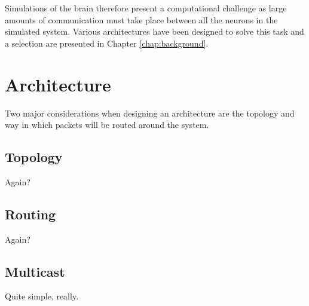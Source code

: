 			Simulations of the brain therefore present a computational challenge as
			large amounts of communication must take place between all the neurons
			in the simulated system. Various architectures have been designed to
			solve this task and a selection are presented in Chapter
			\ref{chap:background}.
			
	
	\section{Architecture}
		
		Two major considerations when designing an architecture are the topology and
		way in which packets will be routed around the system.
		
		\subsection{Topology}
			
			Again?
		
		\subsection{Routing}
			
			Again?
		
		\subsection{Multicast}
			
			Quite simple, really.


